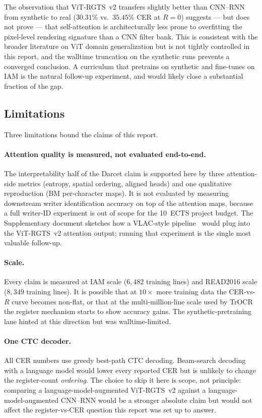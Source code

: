 The observation that ViT-RGTS~v2 transfers slightly better than CNN--RNN from synthetic to real ($30.31\%$ vs.\ $35.45\%$ CER at $R = 0$) suggests --- but does not prove --- that self-attention is architecturally less prone to overfitting the pixel-level rendering signature than a CNN filter bank. This is consistent with the broader literature on ViT domain generalization but is not tightly controlled in this report, and the walltime truncation on the synthetic runs prevents a converged conclusion. A curriculum that pretrains on synthetic and fine-tunes on IAM is the natural follow-up experiment, and would likely close a substantial fraction of the gap.

\subsection{Limitations}
\label{sec:disc_limits}

Three limitations bound the claims of this report.

\paragraph{Attention quality is measured, not evaluated end-to-end.} The interpretability half of the Darcet claim is supported here by three attention-side metrics (entropy, spatial ordering, aligned heads) and one qualitative reproduction (BM per-character maps). It is not evaluated by measuring downstream writer identification accuracy on top of the attention maps, because a full writer-ID experiment is out of scope for the 10~ECTS project budget. The Supplementary document sketches how a VLAC-style pipeline~\cite{souibgui2022vlac} would plug into the ViT-RGTS~v2 attention output; running that experiment is the single most valuable follow-up.

\paragraph{Scale.} Every claim is measured at IAM scale ($6{,}482$ training lines) and READ2016 scale ($8{,}349$ training lines). It is possible that at $10 \times$ more training data the CER-vs-$R$ curve becomes non-flat, or that at the multi-million-line scale used by TrOCR the register mechanism starts to show accuracy gains. The synthetic-pretraining lane hinted at this direction but was walltime-limited.

\paragraph{One CTC decoder.} All CER numbers use greedy best-path CTC decoding. Beam-search decoding with a language model would lower every reported CER but is unlikely to change the register-count \emph{ordering}. The choice to skip it here is scope, not principle: comparing a language-model-augmented ViT-RGTS~v2 against a language-model-augmented CNN--RNN would be a stronger absolute claim but would not affect the register-vs-CER question this report was set up to answer.
